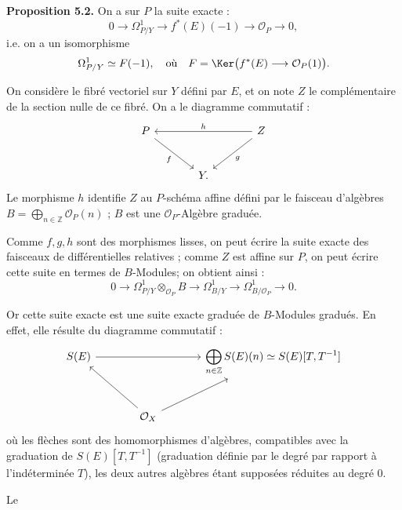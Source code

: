 \textbf{Proposition 5.2.} On a sur \(P\) la suite exacte :
\[
0\longrightarrow\Omega^1_{P/Y}\longrightarrow f^*(E)(-1)\longrightarrow\mathcal O_P\longrightarrow0,
\]
i.e. on a un isomorphisme
\[
\Omega^1_{P/Y}\simeq F(-1),\quad\text{où}\quad F=\Ker\bigl(f^*(E)\longrightarrow\mathcal O_P(1)\bigr).
\]

On considère le fibré vectoriel sur \(Y\) défini par \(E\), et on note \(Z\) le complémentaire de la section nulle de ce fibré. On a le diagramme commutatif :
\[
\begin{tikzcd}[column sep=large,row sep=large]
P \arrow[dr,"f"'] && Z \arrow[ll,"h"'] \arrow[dl,"g"]\\
& Y. &
\end{tikzcd}
\]
Le morphisme \(h\) identifie \(Z\) au \(P\)-schéma affine défini par le faisceau d'algèbres \(B=\bigoplus_{n\in\mathbb Z}\mathcal O_P(n)\) ; \(B\) est une \(\mathcal O_P\)-Algèbre graduée.

Comme \(f,g,h\) sont des morphismes lisses, on peut écrire la suite exacte des faisceaux de différentielles relatives ; comme \(Z\) est affine sur \(P\), on peut écrire cette suite en termes de \(B\)-Modules; on obtient ainsi :
\begin{equation}\tag{5.2.1}
0\longrightarrow
 \Omega^1_{P/Y}\otimes_{\mathcal O_P}B
\longrightarrow
 \Omega^1_{B/Y}
\longrightarrow
 \Omega^1_{B/\mathcal O_P}
\longrightarrow0 .
\end{equation}

Or cette suite exacte est une suite exacte graduée de \(B\)-Modules gradués. En effet, elle résulte du diagramme commutatif :
\[
\begin{tikzcd}[column sep=large,row sep=large]
S(E) \arrow[rr] && \displaystyle\bigoplus_{n\in\mathbb Z}S(E)(n)\simeq S(E)[T,T^{-1}]\\
& \mathcal O_X \arrow[ul] \arrow[ur] &
\end{tikzcd}
\]
où les flèches sont des homomorphismes d'algèbres, compatibles avec la graduation de \(S(E)[T,T^{-1}]\) (graduation définie par le degré par rapport à l'indéterminée \(T\)), les deux autres algèbres étant supposées réduites au degré \(0\).

Le
